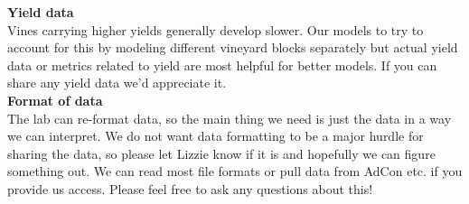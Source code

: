 \documentclass[11pt,letter]{article}
\begin{document}
{\bf Yield data}\\
Vines carrying higher yields generally develop slower. Our models to try to account for this by modeling different vineyard blocks separately but actual yield data or metrics related to yield are most helpful for better models. If you can share any yield data we'd appreciate it.\\

{\bf Format of data}\\
The lab can re-format data, so the main thing we need is just the data in a way we can interpret. We do not want data formatting to be a major hurdle for sharing the data, so please let Lizzie know if it is and hopefully we can figure something out. We can read most file formats or pull data from AdCon etc. if you provide us access. Please feel free to ask any questions about this! 
\end{document}
